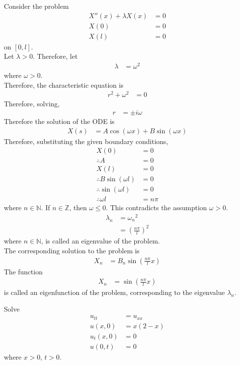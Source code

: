 \documentclass[titlepage, fleqn, a4paper, 12pt, twoside]{article}
\theoremstyle{definition}
\theoremstyle{theorem}
\begin{document}
Consider the problem
\begin{align*}
	X''(x) + \lambda X(x) &= 0\\
	X(0) &= 0\\
	X(l) &= 0
\end{align*}
on $[0,l]$.\\
Let $\lambda > 0$.
Therefore, let
\begin{align*}
	\lambda &= \omega^2
\end{align*}
where $\omega > 0$.\\
Therefore, the characteristic equation is
\begin{align*}
	r^2 + \omega^2 &= 0
\end{align*}
Therefore, solving,
\begin{align*}
	r &= \pm i \omega
\end{align*}
Therefore the solution of the ODE is
\begin{align*}
	X(s) &= A \cos(\omega x) + B \sin(\omega x)
\end{align*}
Therefore, substituting the given boundary conditions,
\begin{align*}
	X(0) &= 0\\
	\therefore A &= 0\\
	X(l) &= 0\\
	\therefore B \sin(\omega l) &= 0\\
	\therefore \sin(\omega l) &= 0\\
	\therefore \omega l &= n \pi
\end{align*}
where $n \in \mathbb{N}$.
\marginnote
{
	If $n \in \mathbb{Z}$, then $\omega \le 0$.
	This contradicts the assumption $\omega > 0$.
}
\begin{align*}
	\lambda_n &= {\omega_n}^2\\
	&= \left( \frac{n \pi}{l} \right)^2
\end{align*}
where $n \in \mathbb{N}$, is called an eigenvalue of the problem.\\
The corresponding solution to the problem is
\begin{align*}
	X_n &= B_n \sin\left( \frac{n \pi}{l} x \right)
\end{align*}
The function
\begin{align*}
	X_n &= \sin\left( \frac{n \pi}{l} x \right)
\end{align*}
is called an eigenfunction of the problem, corresponding to the eigenvalue $\lambda_n$.

\begin{question}
	Solve
	\begin{align*}
		u_{t t} &= u_{x x}\\
		u(x,0) &= x (2 - x)\\
		u_t(x,0) &= 0\\
		u(0,t) &= 0
	\end{align*}
	where $x > 0$, $t > 0$.
\end{question}
\end{document}

